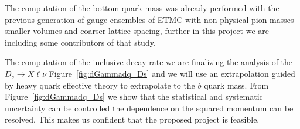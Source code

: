 
The computation of the bottom quark mass was already performed with 
the previous generation of gauge ensembles of ETMC \cite{ETM:2016nbo} with 
non physical pion masses smaller volumes and coarser lattice spacing, 
further in this project  we are including some contributors of that study.

The computation of the   inclusive decay rate we are finalizing the 
analysis of the $D_s\to X \ell \nu$ Figure~\ref{fig:dGammadq_Ds} and
we will use an extrapolation guided by heavy quark effective theory to extrapolate 
to the $b$ quark mass. 
From  Figure~\ref{fig:dGammadq_Ds} we show that the statistical and systematic
uncertainty can be controlled  the
dependence on the squared momentum can be resolved. This makes us
confident that the proposed project is feasible.

\endinput
